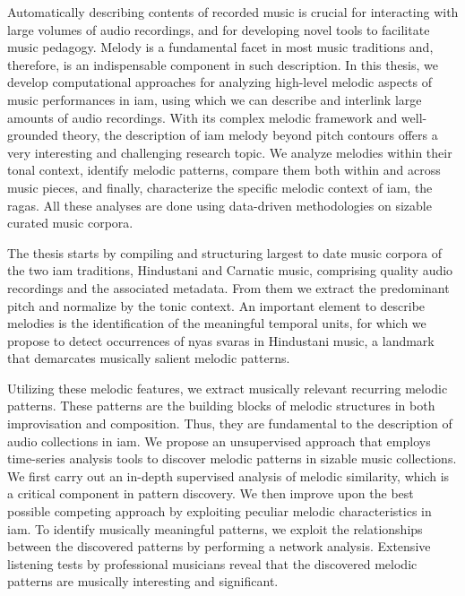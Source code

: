 
Automatically describing contents of recorded music is crucial for interacting with large volumes of audio recordings, and for developing novel tools to facilitate music pedagogy. Melody is a fundamental facet in most music traditions and, therefore, is an indispensable component in such description. In this thesis, we develop computational approaches for analyzing high-level melodic aspects of music performances in \gls{iam}, using which we can describe and interlink large amounts of audio recordings. With its complex melodic framework and well-grounded theory, the description of \gls{iam} melody beyond pitch contours offers a very interesting and challenging research topic. We analyze melodies within their tonal context, identify melodic patterns, compare them both within and across music pieces, and finally, characterize the specific melodic context of \gls{iam}, the \glspl{raga}. All these analyses are done using data-driven methodologies on sizable curated music corpora.

The thesis starts by compiling and structuring largest to date music corpora of the two \gls{iam} traditions, Hindustani and Carnatic music, comprising quality audio recordings and the associated metadata. From them we extract the predominant pitch and normalize by the tonic context. An important element to describe melodies is the identification of the meaningful temporal units, for which we propose to detect occurrences of \gls{nyas} \glspl{svara} in Hindustani music, a landmark that demarcates musically salient melodic patterns.

Utilizing these melodic features, we extract musically relevant recurring melodic patterns. These patterns are the building blocks of melodic structures in both improvisation and composition. Thus, they are fundamental to the description of audio collections in \gls{iam}. We propose an unsupervised approach that employs time-series analysis tools to discover melodic patterns in sizable music collections. We first carry out an in-depth supervised analysis of melodic similarity, which is a critical component in pattern discovery. We then improve upon the best possible competing approach by exploiting peculiar melodic characteristics in \gls{iam}. To identify musically meaningful patterns, we exploit the relationships between the discovered patterns by performing a network analysis. Extensive listening tests by professional musicians reveal that the discovered melodic patterns are musically interesting and significant.

